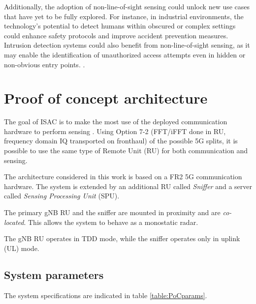 Additionally, the adoption of non-line-of-sight sensing could unlock new use cases that have yet to be fully explored. For instance, in industrial environments, the technology's potential to detect humans within obscured or complex settings could enhance safety protocols and improve accident prevention measures. Intrusion detection systems could also benefit from non-line-of-sight sensing, as it may enable the identification of unauthorized access attempts even in hidden or non-obvious entry points. 
.

\section{Proof of concept architecture}
\label{sec:intro-PoCarchitecture}

The goal of ISAC is to make the most use of the deployed communication hardware to perform sensing \cite{Wild_Grudnitsky_Mandelli_Henninger_Guan_Schaich_2023}. Using Option 7-2 (FFT/iFFT done in RU, frequency domain IQ transported on fronthaul) of the possible 5G splits, it is possible to use the same type of Remote Unit (RU) for both communication and sensing.

The architecture considered in this work is based on a FR2 5G communication hardware. The system is extended by an additional RU called \textit{Sniffer} and a server called \textit{Sensing Processing Unit} (SPU).

The primary gNB RU and the sniffer are mounted in proximity and are \textit{co-located}. This allows the system to behave as a monostatic radar.

The gNB RU operates in TDD mode, while the sniffer operates only in uplink (UL) mode.

\subsection{System parameters}

The system specifications are indicated in table \ref{table:PoCparams}.

